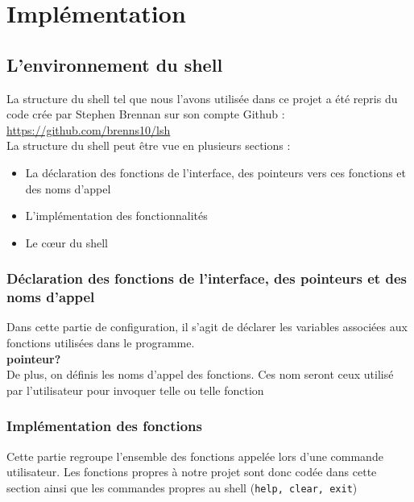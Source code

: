\documentclass[10pt,a4paper]{article}
\begin{document}
\section{Implémentation}
\subsection{L'environnement du shell}
La structure du shell tel que nous l'avons utilisée dans ce projet a été repris du code crée par Stephen Brennan sur son compte Github : \url{https://github.com/brenns10/lsh}\\

La structure du shell peut être vue en plusieurs sections :
\begin{itemize}
\item La déclaration des fonctions de l'interface, des pointeurs vers ces fonctions et des noms d'appel
\item L'implémentation des fonctionnalités
\item Le c\oe{}ur du shell 
\end{itemize}

\subsubsection{Déclaration des fonctions de l'interface, des pointeurs et des noms d'appel}
Dans cette partie de configuration, il s'agit de déclarer les variables associées aux fonctions utilisées dans le programme.\\

\textbf{pointeur?}\\

De plus, on définis les noms d'appel des fonctions. Ces nom seront ceux utilisé par l'utilisateur pour invoquer telle ou telle fonction

\subsubsection{Implémentation des fonctions}
Cette partie regroupe l'ensemble des fonctions appelée lors d'une commande utilisateur. Les fonctions propres à notre projet sont donc codée dans cette section ainsi que les commandes propres au shell (\texttt{help, clear, exit})
\end{document}

